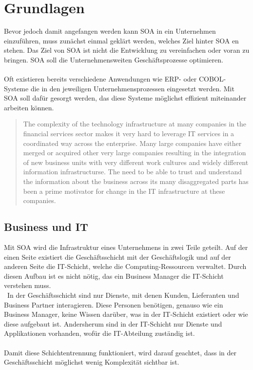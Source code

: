 \section{Grundlagen}
\label{sec:Grundlagen}
Bevor jedoch damit angefangen werden kann SOA in ein Unternehmen einzuführen, muss zunächst einmal geklärt werden, welches Ziel hinter SOA en stehen. Das Ziel von SOA ist nicht die Entwicklung zu vereinfachen oder voran zu bringen. SOA soll die Unternehmensweiten Geschäftsprozesse optimieren.
\\\\
Oft existieren bereits verschiedene Anwendungen wie ERP- oder COBOL-Systeme die in den jeweiligen Unternehmensprozessen eingesetzt werden. Mit SOA soll dafür gesorgt werden, das diese Systeme möglichst effizient miteinander arbeiten können.
\begin{quotation}
    \frqq The complexity of the technology infrastructure at many companies in the financial services sector makes it very hard to leverage IT services in a coordinated way across the enterprise. Many large companies have either merged or acquired other very large companies resulting in the integration of new business units with very different work cultures and widely different information infrastructurse. The need to be able to trust and understand the information about the business across its many disaggregated parts has been a prime motivator for change in the IT infrastructure at these companies.\flqq \cite[S. 17]{SOAForDummies}
\end{quotation}

\subsection{Business und IT}
\label{subsec:BusinessAndIT}
Mit SOA wird die Infrastruktur eines Unternehmens in zwei Teile geteilt. Auf der einen Seite existiert die Geschäftsschicht mit der Geschäftslogik und auf der anderen Seite die IT-Schicht, welche die Computing-Ressourcen verwaltet. Durch diesen Aufbau ist es nicht nötig, das ein Business Manager die IT-Schicht verstehen muss.
\\\
In der Geschäftsschicht sind nur Dienste, mit denen Kunden, Lieferanten und Business Partner interagieren. Diese Personen benötigen, genauso wie ein Business Manager, keine Wissen darüber, was in der IT-Schicht existiert oder wie diese aufgebaut ist. Andersherum sind in der IT-Schicht nur Dienste und Applikationen vorhanden, wofür die IT-Abteilung zuständig ist.
\\\\
Damit diese Schichtentrennung funktioniert, wird darauf geachtet, dass in der Geschäftsschicht möglichst wenig Komplexität sichtbar ist.

